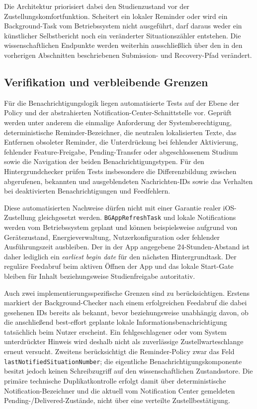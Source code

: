 \begin{neu}
Die Architektur priorisiert dabei den Studienzustand vor der Zustellungskomfortfunktion. Scheitert ein lokaler Reminder oder wird ein Background-Task vom Betriebssystem nicht ausgeführt, darf daraus weder ein künstlicher Selbstbericht noch ein veränderter Situationszähler entstehen. Die wissenschaftlichen Endpunkte werden weiterhin ausschließlich über den in den vorherigen Abschnitten beschriebenen Submission- und Recovery-Pfad verändert.

\subsection{Verifikation und verbleibende Grenzen}

Für die Benachrichtigungslogik liegen automatisierte Tests auf der Ebene der Policy und der abstrahierten Notification-Center-Schnittstelle vor. Geprüft werden unter anderem die einmalige Anforderung der Systemberechtigung, deterministische Reminder-Bezeichner, die neutralen lokalisierten Texte, das Entfernen obsoleter Reminder, die Unterdrückung bei fehlender Aktivierung, fehlender Feature-Freigabe, Pending-Transfer oder abgeschlossenem Studium sowie die Navigation der beiden Benachrichtigungstypen. Für den Hintergrundchecker prüfen Tests insbesondere die Differenzbildung zwischen abgerufenen, bekannten und ausgeblendeten Nachrichten-IDs sowie das Verhalten bei deaktivierten Benachrichtigungen und Feedfehlern.

Diese automatisierten Nachweise dürfen nicht mit einer Garantie realer iOS-Zustellung gleichgesetzt werden. \texttt{BGAppRefreshTask} und lokale Notifications werden vom Betriebssystem geplant und können beispielsweise aufgrund von Gerätezustand, Energieverwaltung, Nutzerkonfiguration oder fehlender Ausführungszeit ausbleiben. Der in der App angegebene 24-Stunden-Abstand ist daher lediglich ein \emph{earliest begin date} für den nächsten Hintergrundtask. Der reguläre Feedabruf beim aktiven Öffnen der App und das lokale Start-Gate bleiben für Inhalt beziehungsweise Studienfreigabe autoritativ.

Auch zwei implementierungsspezifische Grenzen sind zu berücksichtigen. Erstens markiert der Background-Checker nach einem erfolgreichen Feedabruf die dabei gesehenen IDs bereits als bekannt, bevor beziehungsweise unabhängig davon, ob die anschließend best-effort geplante lokale Informationsbenachrichtigung tatsächlich beim Nutzer erscheint. Ein fehlgeschlagener oder vom System unterdrückter Hinweis wird deshalb nicht als zuverlässige Zustellwarteschlange erneut versucht. Zweitens berücksichtigt die Reminder-Policy zwar das Feld \texttt{lastNotifiedSituationNumber}; die eigentliche Benachrichtigungskomponente besitzt jedoch keinen Schreibzugriff auf den wissenschaftlichen Zustandsstore. Die primäre technische Duplikatkontrolle erfolgt damit über deterministische Notification-Bezeichner und die aktuell vom Notification Center gemeldeten Pending-/Delivered-Zustände, nicht über eine verteilte Zustellbestätigung.


\end{neu}
